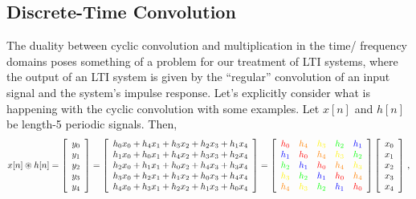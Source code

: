 \subsection{Discrete-Time Convolution}
%
The duality between cyclic convolution and multiplication in the time/ frequency
domains poses something of a problem for our treatment of LTI systems, where
the output of an LTI system is given by the ``regular'' convolution of an
input signal and the system's impulse response. Let's explicitly consider what
is happening with the cyclic convolution with some examples. Let $x[n]$ and $h[n]$
be length-5 periodic signals. Then,
%
\begin{displaymath}
  x[n]\circledast h[n] =
  \left[\begin{array}{c}
      y_0 \\ y_1 \\ y_2 \\ y_3 \\ y_4
    \end{array}\right] =
  \left[\begin{array}{c}
      h_0x_0 + h_4x_1 + h_3x_2 + h_2x_3 + h_1x_4 \\
      h_1x_0 + h_0x_1 + h_4x_2 + h_3x_3 + h_2x_4 \\
      h_2x_0 + h_1x_1 + h_0x_2 + h_4x_3 + h_3x_4 \\
      h_3x_0 + h_2x_1 + h_1x_2 + h_0x_3 + h_4x_4 \\
      h_4x_0 + h_3x_1 + h_2x_2 + h_1x_3 + h_0x_4
    \end{array}\right]
  = \left[\begin{array}{ccccc}
      \red{h_0} & \orn{h_4} & \yel{h_3} & \grn{h_2} & \blu{h_1} \\
      \blu{h_1} & \red{h_0} & \orn{h_4} & \yel{h_3} & \grn{h_2} \\
      \grn{h_2} & \blu{h_1} & \red{h_0} & \orn{h_4} & \yel{h_3} \\
      \yel{h_3} & \grn{h_2} & \blu{h_1} & \red{h_0} & \orn{h_4} \\
      \orn{h_4} & \yel{h_3} & \grn{h_2} & \blu{h_1} & \red{h_0}
    \end{array}\right] \left[\begin{array}{c}
      x_0 \\ x_1 \\ x_2 \\ x_3 \\ x_4
    \end{array}\right] \,,
\end{displaymath}
